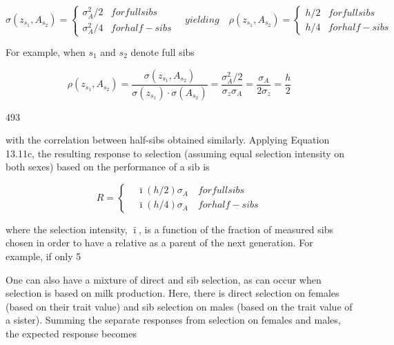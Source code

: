 \documentclass{article}
\begin{document}
\begin{equation}
\sigma(z_{s_{1}},A_{s_{2}})=\left\{\begin{array}{ll}\sigma_{A}^{2}/2&for full sibs\\\sigma_{A}^{2}/4&for half-sibs\end{array}\quad yielding\quad\rho(z_{s_{1}},A_{s_{2}})=\left\{\begin{array}{ll}h/2&for full sibs\\h/4&for half-sibs\end{array}\right.\right.
\end{equation}

For example, when  $ s_{1} $ and  $ s_{2} $ denote full sibs

\begin{equation}
\rho(z_{s_{1}},A_{s_{2}})=\frac{\sigma(z_{s_{1}},A_{s_{2}})}{\sigma(z_{s_{1}})\cdot\sigma(A_{s_{2}})}=\frac{\sigma_{A}^{2}/2}{\sigma_{z}\sigma_{A}}=\frac{\sigma_{A}}{2\sigma_{z}}=\frac{h}{2}
\end{equation}

493

with the correlation between half-sibs obtained similarly. Applying Equation 13.11c, the resulting response to selection (assuming equal selection intensity on both sexes) based on the performance of a sib is

\begin{equation}
R=\left\{\begin{aligned}&\bar{\imath}\left(h/2\right)\sigma_{A}\quad for full sibs\\&\bar{\imath}\left(h/4\right)\sigma_{A}\quad for half-sibs\end{aligned}\right.
\end{equation}

where the selection intensity,  $ \bar{\imath} $, is a function of the fraction of measured sibs chosen in order to have a relative as a parent of the next generation. For example, if only 5%

One can also have a mixture of direct and sib selection, as can occur when selection is based on milk production. Here, there is direct selection on females (based on their trait value) and sib selection on males (based on the trait value of a sister). Summing the separate responses from selection on females and males, the expected response becomes
\end{document}
